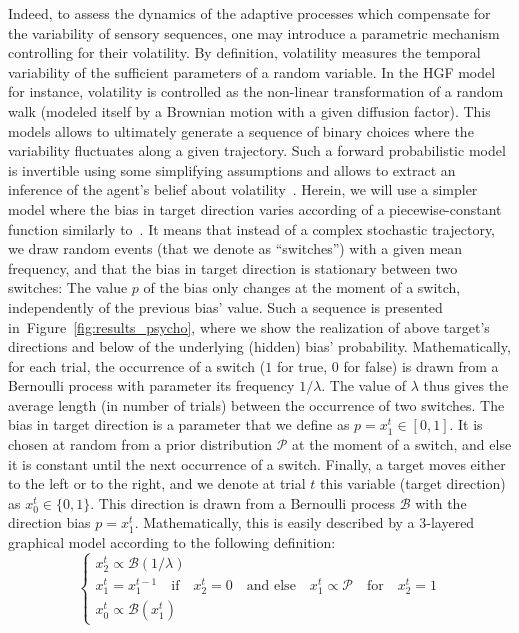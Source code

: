 \documentclass[profile,final,english, draft]{article}%
\newcommand{\choice}[1]{ %
	\left\{ %
		\begin{array}{l} #1 \end{array} %
	\right. }
\newcommand{\eql}[1]{\begin{equation}#1\end{equation}}
\newcommand{\Bb}{\mathcal{B}}
\newcommand{\Pp}{\mathcal{P}}
\newcommand{\citep}[1]{\parencite{#1}}
\newcommand{\citet}[1]{\textcite{#1}}
\newcommand{\seeFig}[1]{Figure~\ref{fig:#1}}
\begin{document}
Indeed, to assess the dynamics of the adaptive processes
which compensate for the variability of sensory sequences,
one may introduce a parametric mechanism controlling for their volatility.
By definition, volatility measures the temporal variability
of the sufficient parameters of a random variable.
In the HGF model~\citep{Matthys2011} for instance,
volatility is controlled as the non-linear transformation
of a random walk (modeled itself by a Brownian motion with a given diffusion factor).
This models allows to ultimately generate a sequence of binary choices
where the variability fluctuates along a given trajectory.
Such a forward probabilistic model is invertible
using some simplifying assumptions and allows
to extract an inference of the agent's belief about volatility~\citep{Voessel??}.
Herein, we will use a simpler model where
the bias in target direction varies according of a piecewise-constant function
similarly to~\citet{Meyniel13}.
It means that instead of a complex stochastic trajectory, 
we draw random events (that we denote as ``switches'')
with a given mean frequency,
and that the bias in target direction is stationary between two switches:
The value $p$ of the bias only changes at the moment of a switch,
independently of the previous bias' value.
Such a sequence is presented in~\seeFig{results_psycho},
where we show the realization of above target's directions and
below of the underlying (hidden) bias' probability.
Mathematically, for each trial, 
the occurrence of a switch ($1$ for true, $0$ for false)
is  drawn from a Bernoulli process with parameter its frequency $1/\lambda$.
The value of $\lambda$ thus gives the average length (in number of trials) 
between the occurrence of two switches.
The bias in target direction is a parameter that we define as $p=x_1^t \in [0, 1]$.
It is chosen at random from a prior distribution $\Pp$ at the moment of a switch,
and else it is constant until the next occurrence of a switch.
Finally, a target moves either to the left or to the right,
and we denote at trial $t$ this variable (target direction) as $x_0^t\in \{ 0, 1 \}$.
This direction is drawn from a Bernoulli process $\Bb$
with the direction bias $p=x_1^t$.
Mathematically, this is easily described
by a 3-layered graphical model according to %
the following definition:
\eql{\choice{
x_2^t \propto \Bb(1/\lambda) \\
x_1^t = x_1^{t-1} \quad \text{if} \quad x_2^t=0 \quad \text{and else} \quad x_1^t \propto \Pp \quad \text{for} \quad x_2^t=1 \\
x_0^t \propto \Bb(x_1^t)
}\label{eq:sgm}}
\end{document}
